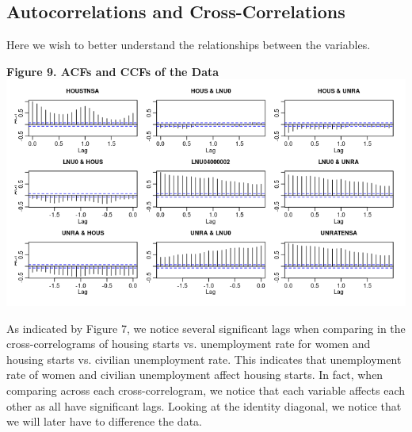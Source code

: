 \documentclass[11pt]{article}
\begin{document}
\subsection{Autocorrelations and Cross-Correlations}
Here we wish to better understand the relationships between the variables.
\begin{center}
\textbf{Figure 9. ACFs and CCFs of the Data}
\\
\includegraphics[scale=1]{ccf}
\end{center}
As indicated by Figure 7, we notice several significant lags when comparing in the cross-correlograms of housing starts vs. unemployment rate for women and housing starts vs. civilian unemployment rate. This indicates that unemployment rate of women and civilian unemployment affect housing starts. In fact, when comparing across each cross-correlogram, we notice that each variable affects each other as all have significant lags. Looking at the identity diagonal, we notice that we will later have to difference the data.
\end{document}
